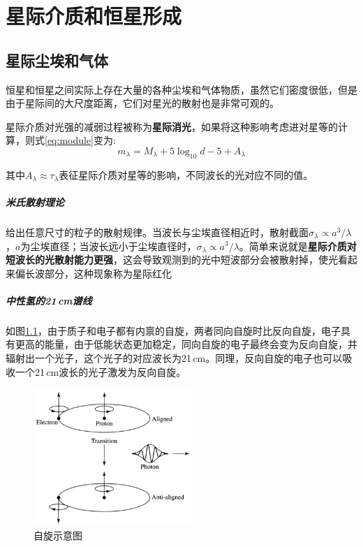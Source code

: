 \chapter{星际介质和恒星形成}
\section{星际尘埃和气体}
恒星和恒星之间实际上存在大量的各种尘埃和气体物质，虽然它们密度很低，但是由于星际间的大尺度距离，它们对星光的散射也是非常可观的。

星际介质对光强的减弱过程被称为\textbf{星际消光}，如果将这种影响考虑进对星等的计算，则式\ref{eq:module}变为:
\begin{equation}
  m_\lambda=M_\lambda+5\log_{10}d-5+A_\lambda
\end{equation}

其中$A_\lambda \approx \tau_\lambda$表征星际介质对星等的影响，不同波长的光对应不同的值。

\paragraph{米氏散射理论}
给出任意尺寸的粒子的散射规律。当波长与尘埃直径相近时，散射截面$\sigma_\lambda \propto a^3/\lambda$，$a$为尘埃直径；当波长远小于尘埃直径时，$\sigma_\lambda \propto a^3/\lambda$。简单来说就是\textbf{星际介质对短波长的光散射能力更强}，这会导致观测到的光中短波部分会被散射掉，使光看起来偏长波部分，这种现象称为星际红化


\paragraph{中性氢的21\,cm谱线}
如图\ref{fig:21cm}，由于质子和电子都有内禀的自旋，两者同向自旋时比反向自旋，电子具有更高的能量，由于低能状态更加稳定，同向自旋的电子最终会变为反向自旋，并辐射出一个光子，这个光子的对应波长为21\,cm。同理，反向自旋的电子也可以吸收一个21\,cm波长的光子激发为反向自旋。

\begin{figure}[hbt]
  \centering
  \includegraphics[width=6cm]{chapters/12/21cm}
  \caption{自旋示意图}
  \label{fig:21cm}
\end{figure}

